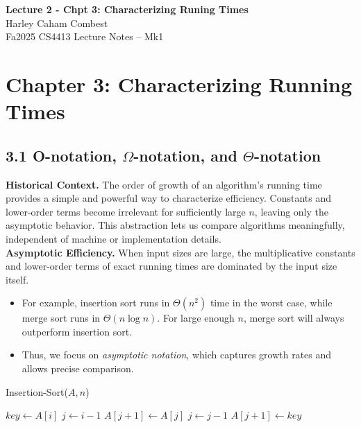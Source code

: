 \documentclass[12pt]{article}
\theoremstyle{definition}
\begin{document}
\begin{center}
\Large\textbf{Lecture 2 - Chpt 3: Characterizing Runing Times} \\
\large Harley Caham Combest \\
\large Fa2025 CS4413 Lecture Notes – Mk1
\end{center}

\vspace{1em}

\dotfill

\section*{Chapter 3: Characterizing Running Times}

\dotfill

\subsection*{3.1 O-notation, $\Omega$-notation, and $\Theta$-notation\vspace{1em}\\}

\noindent
\textbf{Historical Context.}  
The order of growth of an algorithm’s running time provides a simple and powerful way to characterize efficiency. Constants and lower-order terms become irrelevant for sufficiently large $n$, leaving only the asymptotic behavior. This abstraction lets us compare algorithms meaningfully, independent of machine or implementation details.  \\

\noindent
\textbf{Asymptotic Efficiency.}  
When input sizes are large, the multiplicative constants and lower-order terms of exact running times are dominated by the input size itself.  
\begin{itemize}
    \item For example, insertion sort runs in $\Theta(n^2)$ time in the worst case, while merge sort runs in $\Theta(n \log n)$. For large enough $n$, merge sort will always outperform insertion sort.  
    \item Thus, we focus on \emph{asymptotic notation}, which captures growth rates and allows precise comparison.  
\end{itemize}

\begin{algorithm}[H]
\caption{Insertion-Sort($A, n$)}
\begin{algorithmic}[1]
  \State $key \gets A[i]$
  \State $j \gets i - 1$
    \State $A[j+1] \gets A[j]$
    \State $j \gets j - 1$
  \EndWhile
  \State $A[j+1] \gets key$
\EndFor
\end{algorithmic}
\end{algorithm}
\end{document}
